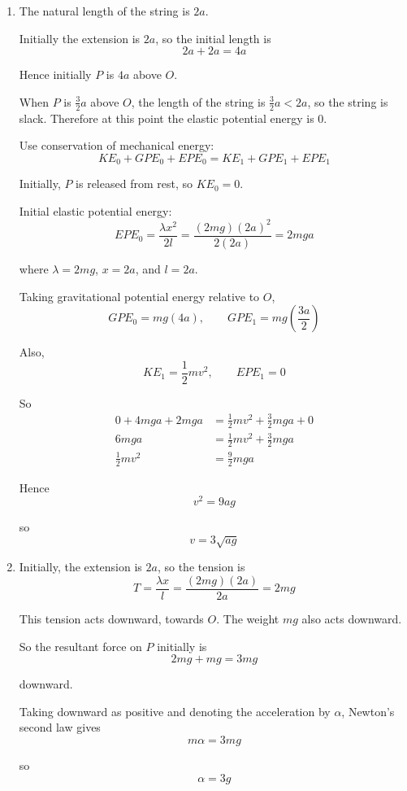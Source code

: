 \documentclass[leqno]{article}
\begin{document}
\begin{enumerate}[
  label=\textbf{\arabic*.},
  leftmargin=*,
  topsep=0pt,
  partopsep=0pt,
  parsep=0pt
]
\vspace*{10pt}

\begin{djsSolution}
\begin{enumerate}[label=\textbf{(\alph*)}, start=1]
  \item The natural length of the string is $2a$.

Initially the extension is $2a$, so the initial length is
\[
2a+2a=4a
\]

Hence initially $P$ is $4a$ above $O$.

When $P$ is $\frac{3}{2}a$ above $O$, the length of the string is $\frac{3}{2}a<2a$, so the string is slack. Therefore at this point the elastic potential energy is $0$.

Use conservation of mechanical energy:
\[
KE_0+GPE_0+EPE_0=KE_1+GPE_1+EPE_1
\]

Initially, $P$ is released from rest, so $KE_0=0$.

Initial elastic potential energy:
\[
EPE_0=\frac{\lambda x^2}{2l}
=\frac{(2mg)(2a)^2}{2(2a)}
=2mga
\]

where $\lambda=2mg$, $x=2a$, and $l=2a$.

Taking gravitational potential energy relative to $O$,
\[
GPE_0=mg(4a),\qquad GPE_1=mg\left(\frac{3a}{2}\right)
\]

Also,
\[
KE_1=\frac12 mv^2,\qquad EPE_1=0
\]

So
\begin{align*}
0+4mga+2mga&=\frac12 mv^2+\frac32 mga+0 \\
6mga&=\frac12 mv^2+\frac32 mga \\
\frac12 mv^2&=\frac92 mga
\end{align*}

Hence
\[
v^2=9ag
\]

so
\[
v=3\sqrt{ag}
\]


  \item Initially, the extension is $2a$, so the tension is
\[
T=\frac{\lambda x}{l}
=\frac{(2mg)(2a)}{2a}
=2mg
\]

This tension acts downward, towards $O$. The weight $mg$ also acts downward.

So the resultant force on $P$ initially is
\[
2mg+mg=3mg
\]

downward.

Taking downward as positive and denoting the acceleration by $\alpha$, Newton's second law gives
\[
m\alpha=3mg
\]

so
\[
\alpha=3g
\]


\end{enumerate}
\end{djsSolution}
\end{enumerate}
\end{document}
